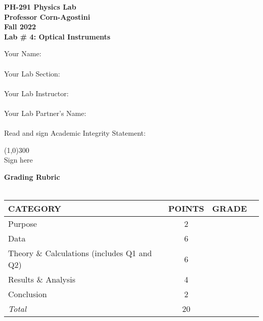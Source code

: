 

\begin{titlepage}

        \begin{center}
        \textbf{\huge PH-291 Physics Lab} \\ 
        \textbf{\Large Professor Corn-Agostini} \\ 
        \textbf{\Large Fall 2022} \\ 
        \vspace*{.5cm}  
        \textbf{\large Lab \# 4: Optical Instruments}
        \vspace{0.5cm}
        \end{center}
       
\noindent Your Name:\\ \\
\noindent Your Lab Section:\\ \\
\noindent Your Lab Instructor:\\ \\
\noindent Your Lab Partner's Name:\\ \\
\noindent Read and sign Academic Integrity Statement:\\


    \begin{center}
    \line(1,0){300} \\
    Sign here
    \end{center}

\noindent\textbf{\large Grading Rubric} \\ \\
\renewcommand{\arraystretch}{1.5}
\begin{tabular}{|l|c|r|l|} \hline
 {\bf CATEGORY} & {\bf POINTS} & {\bf GRADE}\\\hline 
Purpose & 2 & \\\hline
Data & 6 & \\\hline
Theory \& Calculations (includes Q1 and Q2) & 6 & \\\hline 
Results \& Analysis & 4 & \\\hline 
Conclusion  & 2 & \\\hline \hline 
{\em Total} & 20 & \\ \hline
\end{tabular}

\end{titlepage} 




